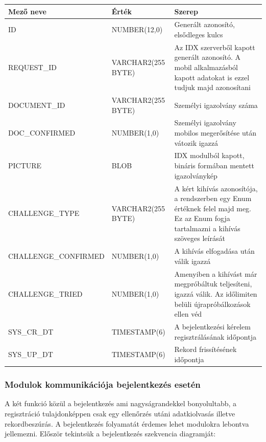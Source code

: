 \begin{tabular}{|p{5.5cm}|p{3cm} |p{6cm}|}
   	\hline
	\textbf{Mező neve} & \textbf{Érték} & \textbf{Szerep}\\ \hline
	ID & NUMBER(12,0) & Generált azonosító, elsődleges kulcs \\ \hline
	REQUEST\_ID & VARCHAR2(255 BYTE) & Az IDX szerverből kapott generált azonosító. A mobil alkalmazásból kapott adatokat is ezzel tudjuk majd azonosítani \\ \hline
	DOCUMENT\_ID & VARCHAR2(255 BYTE)& Személyi igazolvány száma \\ \hline
	DOC\_CONFIRMED & NUMBER(1,0) & Személyi igazolvány mobilos megerősítése után vátozik igazzá\\ \hline
	PICTURE & BLOB & IDX modulból kapott, bináris formában mentett igazolványkép\\ \hline
	CHALLENGE\_TYPE & VARCHAR2(255 BYTE)& A kért kihívás azonosítója, a rendszerben egy Enum értéknek felel majd meg. Ez az Enum fogja tartalmazni a kihívás szöveges leírását \\ \hline
	CHALLENGE\_CONFIRMED & NUMBER(1,0)& A kihívás elfogadása után válik igazzá \\ \hline
	CHALLENGE\_TRIED & NUMBER(1,0) & Amenyiben a kihívást már megpróbáltuk teljesíteni, igazzá válik. Az időlimiten belüli újrapróbálkozások ellen véd \\ \hline
	SYS\_CR\_DT & TIMESTAMP(6)& A bejelentkezési kérelem regisztrálásának időpontja \\ \hline
	SYS\_UP\_DT & TIMESTAMP(6)& Rekord frissítésének időpontja \\ \hline
\end{tabular}

\subsubsection{Modulok kommunikációja bejelentkezés esetén}
A két funkció közül a bejelentkezés ami nagyságrandekkel bonyolultabb, a regisztráció tulajdonképpen csak egy ellenőrzés utáni adatkiolvasás illetve rekordbeszúrás. A bejelentkezés folyamatát érdemes lehet modulokra lebontva jellemezni.
Először tekintsük a bejelentkezés szekvencia diagramját:


